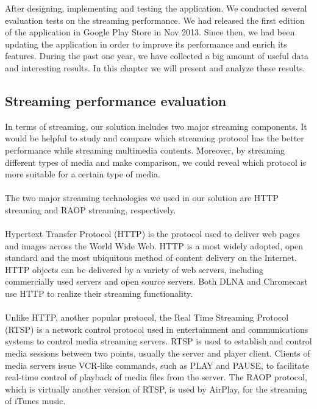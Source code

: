 
After designing, implementing and testing the application. We conducted several evaluation tests on the streaming performance. We had released the first edition of the application in Google Play Store in Nov 2013. Since then, we had been updating the application in order to improve its performance and enrich its features. During the past one year, we have collected a big amount of useful data and interesting results. In this chapter we will present and analyze these results.
\subsection{Streaming performance evaluation}
In terms of streaming, our solution includes two major streaming components. It would be helpful to study and compare which streaming protocol has the better performance while streaming multimedia contents. Moreover, by streaming different types of media and make comparison, we could reveal which protocol is more suitable for a certain type of media. \\
\\The two major streaming technologies we used in our solution are HTTP streaming and RAOP streaming, respectively.\\
\\
Hypertext Transfer Protocol (HTTP) is the protocol used to deliver web pages and images across the World Wide Web. HTTP is a most widely adopted, open standard and the most ubiquitous method of content delivery on the Internet. HTTP objects can be delivered by a variety of web servers, including commercially used servers and open source servers. Both DLNA and Chromecast use HTTP to realize their streaming functionality.\\
\\
Unlike HTTP, another popular protocol, the Real Time Streaming Protocol (RTSP) is a network control protocol used in entertainment and communications systems to control media streaming servers. RTSP is used to establish and control media sessions between two points, usually the server and player client. Clients of media servers issue VCR-like commands, such as PLAY and PAUSE, to facilitate real-time control of playback of media files from the server.  The RAOP protocol, which is virtually another version of RTSP, is used by AirPlay, for the streaming of iTunes music.
